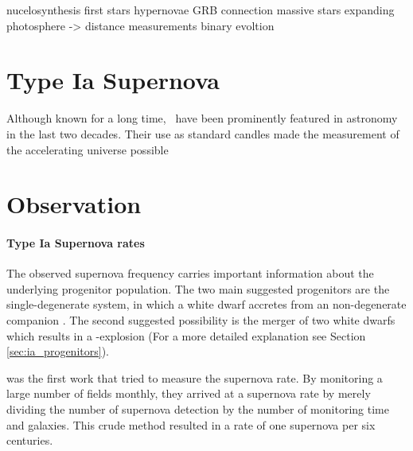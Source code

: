 \vspace{3cm}
nucelosynthesis
first stars
hypernovae
GRB connection
massive stars
expanding photosphere -> distance measurements
binary evoltion




\section{Type Ia Supernova}
Although known for a long time, \sneia\ have been prominently featured in astronomy in the last two decades. Their use as standard candles made the measurement of the accelerating universe possible \citep{1998AJ....116.1009R, 1999ApJ...517..565P}

\section{Observation}

\paragraph{Type Ia Supernova rates} 
The observed supernova frequency carries important information about the underlying progenitor population. The two main suggested progenitors are the single-degenerate system, in which a white dwarf accretes from an non-degenerate companion . The second suggested possibility is the merger of two white dwarfs which results in a \snia-explosion (For a more detailed explanation see Section \ref{sec:ia_progenitors}). 

\citet{1938ApJ....88..529Z} was the first work that tried to measure the supernova rate. By monitoring a large number of fields monthly, they arrived at a supernova rate by merely dividing the number of supernova detection by the number of monitoring time and galaxies. This crude method resulted in a rate of one supernova per six centuries. 


